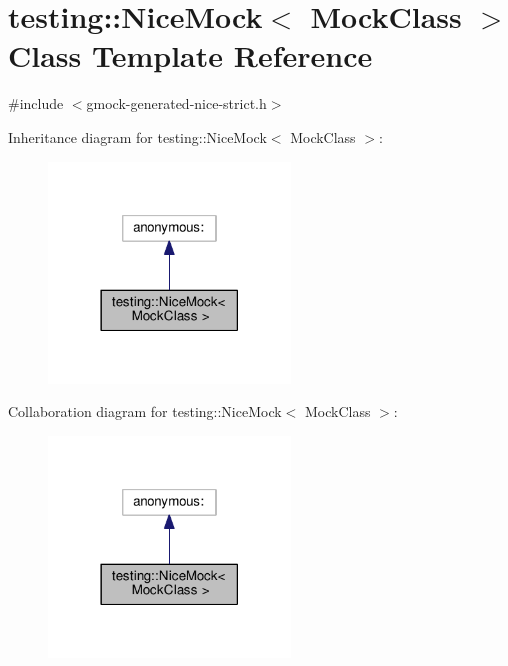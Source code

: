 \hypertarget{classtesting_1_1NiceMock}{}\section{testing\+:\+:Nice\+Mock$<$ Mock\+Class $>$ Class Template Reference}
\label{classtesting_1_1NiceMock}


{\ttfamily \#include $<$gmock-\/generated-\/nice-\/strict.\+h$>$}



Inheritance diagram for testing\+:\+:Nice\+Mock$<$ Mock\+Class $>$\+:
\nopagebreak
\begin{figure}[H]
\begin{center}
\leavevmode
\includegraphics[width=182pt]{classtesting_1_1NiceMock__inherit__graph}
\end{center}
\end{figure}


Collaboration diagram for testing\+:\+:Nice\+Mock$<$ Mock\+Class $>$\+:
\nopagebreak
\begin{figure}[H]
\begin{center}
\leavevmode
\includegraphics[width=182pt]{classtesting_1_1NiceMock__coll__graph}
\end{center}
\end{figure}
